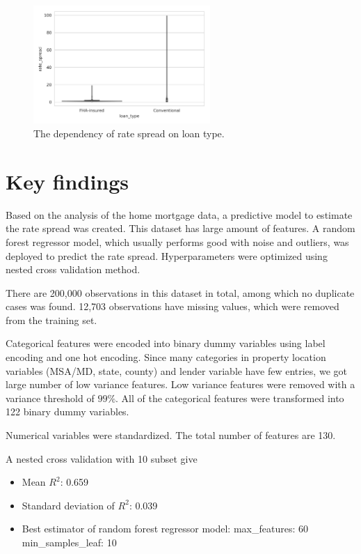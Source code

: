 \documentclass[a4paper,10pt,notitlepage]{article}
\begin{document}
\begin{figure}[H]
\centering
\includegraphics[width=0.6\textwidth]{hmda_violin_loan_type.png}
\caption{The dependency of rate spread on loan type.}
\label{fig:rate_loantype}
\end{figure}


\section{Key findings}

Based on the analysis of the home mortgage data, a predictive model to estimate the rate spread was created.
This dataset has large amount of features. A random forest regressor model, which usually performs good with noise and outliers, was deployed to predict the rate spread. Hyperparameters were optimized using nested cross validation method.

There are 200,000 observations in this dataset in total, among which no duplicate cases was found. 12,703 observations have missing values, which were removed from the training set. 

Categorical features were encoded into binary dummy variables using label encoding and one hot encoding. Since many categories in property location variables (MSA/MD, state, county) and lender variable have few entries, we got large number of low variance features. 
Low variance features were removed with a variance threshold of $99\%$. All of the categorical features were transformed into 122 binary dummy variables.

Numerical variables were standardized. The total number of features are 130.  

A nested cross validation with 10 subset give

\begin{itemize}
    \item Mean $R^2$: 0.659
    \item Standard deviation of $R^2$: 0.039
    \item Best estimator of random forest regressor model: 
        \subitem max\_features: 60
        \subitem min\_samples\_leaf: 10
\end{itemize}
\end{document}
